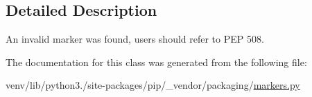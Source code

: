 \subsection{Detailed Description}
\begin{DoxyVerb}An invalid marker was found, users should refer to PEP 508.
\end{DoxyVerb}
 

The documentation for this class was generated from the following file\+:\begin{DoxyCompactItemize}
\item 
venv/lib/python3./site-\/packages/pip/\+\_\+vendor/packaging/\hyperlink{pip_2__vendor_2packaging_2markers_8py}{markers.\+py}\end{DoxyCompactItemize}
